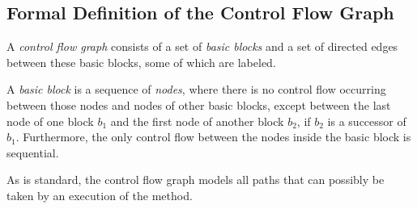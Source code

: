 \subsection{Formal Definition of the Control Flow Graph}
\label{sec:cfg-formal}

\begin{definition}
    A \emph{control flow graph} consists of a set of \emph{basic blocks} and
    a set of directed edges between these basic blocks, some of which are labeled.
\end{definition}

\begin{definition}
    A \emph{basic block} is a sequence of \emph{nodes}, where there is no
    control flow occurring between those nodes and nodes of other basic
    blocks, except between the last node of one block $b_1$ and the first node
    of another block $b_2$, if $b_2$ is a successor of $b_1$.
    Furthermore, the only control flow between the nodes inside
    the basic block is sequential.
    
    As is standard, the control flow graph models all paths that can possibly be taken by
    an execution of the method.
\end{definition}



